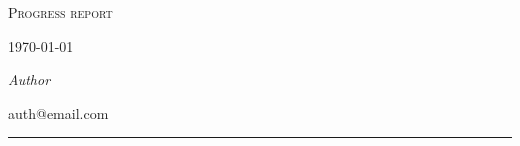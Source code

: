{
	\centering
	{\scshape\LARGE Progress report \par}
	{\today\par}
	{\large\itshape Author\par}
    	{\scriptsize auth@email.com\par}
	\rule{\textwidth}{0.5pt}\par
}